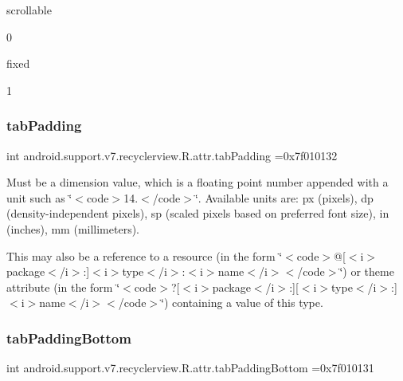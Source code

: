 {\ttfamily scrollable}

0

{\ttfamily fixed}

1\mbox{\label{classandroid_1_1support_1_1v7_1_1recyclerview_1_1R_1_1attr_ace914a97043e0fdc338ed220da7a832e}} 
\subsubsection{\texorpdfstring{tab\+Padding}{tabPadding}}
{\footnotesize\ttfamily int android.\+support.\+v7.\+recyclerview.\+R.\+attr.\+tab\+Padding =0x7f010132\hspace{0.3cm}{\ttfamily [static]}}

Must be a dimension value, which is a floating point number appended with a unit such as \char`\"{}$<$code$>$14.\+5sp$<$/code$>$\char`\"{}. Available units are\+: px (pixels), dp (density-\/independent pixels), sp (scaled pixels based on preferred font size), in (inches), mm (millimeters). 

This may also be a reference to a resource (in the form \char`\"{}$<$code$>$@\mbox{[}$<$i$>$package$<$/i$>$\+:\mbox{]}$<$i$>$type$<$/i$>$\+:$<$i$>$name$<$/i$>$$<$/code$>$\char`\"{}) or theme attribute (in the form \char`\"{}$<$code$>$?\mbox{[}$<$i$>$package$<$/i$>$\+:\mbox{]}\mbox{[}$<$i$>$type$<$/i$>$\+:\mbox{]}$<$i$>$name$<$/i$>$$<$/code$>$\char`\"{}) containing a value of this type. \mbox{\label{classandroid_1_1support_1_1v7_1_1recyclerview_1_1R_1_1attr_a472b07e80eb62d601d7ec6fb237ac3ca}} 
\subsubsection{\texorpdfstring{tab\+Padding\+Bottom}{tabPaddingBottom}}
{\footnotesize\ttfamily int android.\+support.\+v7.\+recyclerview.\+R.\+attr.\+tab\+Padding\+Bottom =0x7f010131\hspace{0.3cm}{\ttfamily [static]}}

